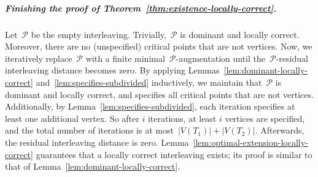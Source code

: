 \documentclass[a4paper,UKenglish, autoref, thm-restate, cleveref]{lipics-v2021}
\renewcommand{\P}{\mathcal{P}}
\begin{document}
\subparagraph{Finishing the proof of Theorem~\ref{thm:existence-locally-correct}.}
Let~$\P$ be the empty interleaving.
Trivially,~$\P$ is dominant and locally correct.
Moreover, there are no (unspecified) critical points that are not vertices.
Now, we iteratively replace~$\P$ with a finite minimal~$\P$-augmentation until the~$\P$-residual interleaving distance becomes zero.
By applying Lemmas~\ref{lem:dominant-locally-correct} and~\ref{lem:specifies-subdivided} inductively, we maintain that~$\P$ is dominant and locally correct, and specifies all critical points that are not vertices.
Additionally, by Lemma~\ref{lem:specifies-subdivided}, each iteration specifies at least one additional vertex.
So after $i$ iterations, at least $i$ vertices are specified, and the total number of iterations is at most~$|V(T_1)| + |V(T_2)|$.
Afterwards, the residual interleaving distance is zero.
Lemma~\ref{lem:optimal-extension-locally-correct} guarantees that a locally correct interleaving exists; its proof is similar to that of Lemma~\ref{lem:dominant-locally-correct}.
\end{document}
